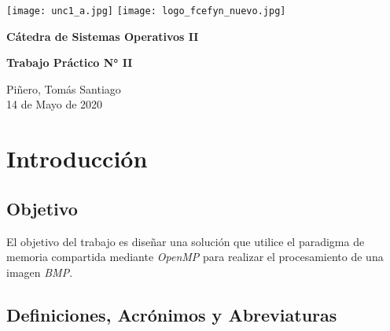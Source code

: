 \documentclass[12pt,a4paper]{article}
\renewcommand{\baselinestretch}{1} %
\begin{document}
\begin{titlepage}
    \begin{center}
      \vspace*{1cm}

      \vspace{2cm}
      \texttt{[image: unc1\_a.jpg]}
      \texttt{[image: logo\_fcefyn\_nuevo.jpg]}

      \Huge
      \textbf{Cátedra de Sistemas Operativos II}

      \vspace{3.5cm}

      \textbf{Trabajo Práctico N\si{\degree} II}

      \vfill

      \vspace{0.8cm}



      \Large
      Piñero, Tomás Santiago\\
      14 de Mayo de 2020
    \end{center}
\end{titlepage}

\setcounter{secnumdepth}{3}
\setcounter{tocdepth}{5}
\tableofcontents


\newpage
\renewcommand{\baselinestretch}{1}
\setlength{\parskip}{0.5em}

\section{Introducción}
\label{intro}

\subsection{Objetivo}
\label{objetivo}
El objetivo del trabajo es diseñar una solución que utilice el paradigma de
memoria compartida mediante \emph{OpenMP} para realizar el procesamiento de
una imagen \emph{BMP}.


\subsection{Definiciones, Acrónimos y Abreviaturas}
\label{daa}
\end{document}
